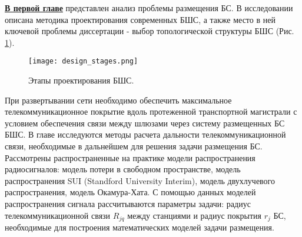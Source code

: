 \underline{\textbf{В первой главе}} представлен анализ проблемы размещения БС. В исследовании описана методика проектирования современных БШС, а также место в ней ключевой проблемы диссертации - выбор топологической структуры БШС (Рис. \cref{fig:part1_design_stages}).


 


\begin{figure}[h!]
    \centering
     \texttt{[image: design\_stages.png]}
  \caption{Этапы проектирования БШС.}
  \label{fig:part1_design_stages}
  \end{figure}



При развертывании сети необходимо обеспечить максимальное телекоммуникационное покрытие вдоль протеженной транспортной магистрали с условием обеспечения связи между шлюзами через систему размещенных БС БШС. В главе исследуются методы расчета дальности телекоммуникационной связи, необходимые в дальнейшем для решения задачи размещения БС. Рассмотрены распространенные на практике модели распространения радиосигналов: модель потери в свободном пространстве,  модель распространения SUI (Standford University Interim), модель двухлучевого распространения, модель Окамура-Хата. С помощью данных моделей распространения сигнала рассчитываются параметры задачи: радиус телекоммуникационной связи $ R_{jq}$ между станциями и радиус покрытия $ r_j $ БС, необходимые для построения математических моделей задачи размещения.





